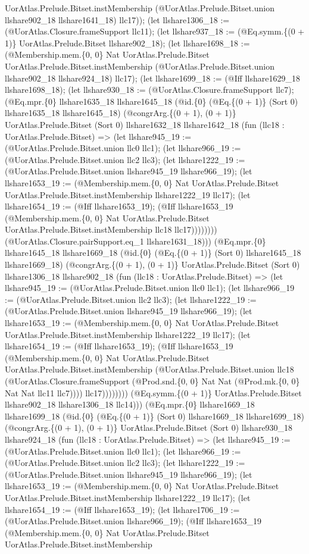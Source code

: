 \documentclass[11pt]{article}
\begin{document}
UorAtlas.Prelude.Bitset.instMembership (@UorAtlas.Prelude.Bitset.union llshare902\_18 llshare1641\_18) llc17)); (let llshare1306\_18 := (@UorAtlas.Closure.frameSupport llc11); (let llshare937\_18 := (@Eq.symm.\{(0 + 1)\} UorAtlas.Prelude.Bitset llshare902\_18); (let llshare1698\_18 := (@Membership.mem.\{0, 0\} Nat UorAtlas.Prelude.Bitset UorAtlas.Prelude.Bitset.instMembership (@UorAtlas.Prelude.Bitset.union llshare902\_18 llshare924\_18) llc17); (let llshare1699\_18 := (@Iff llshare1629\_18 llshare1698\_18); (let llshare930\_18 := (@UorAtlas.Closure.frameSupport llc7); (@Eq.mpr.\{0\} llshare1635\_18 llshare1645\_18 (@id.\{0\} (@Eq.\{(0 + 1)\} (Sort 0) llshare1635\_18 llshare1645\_18) (@congrArg.\{(0 + 1), (0 + 1)\} UorAtlas.Prelude.Bitset (Sort 0) llshare1632\_18 llshare1642\_18 (fun (llc18 : UorAtlas.Prelude.Bitset) => (let llshare945\_19 := (@UorAtlas.Prelude.Bitset.union llc0 llc1); (let llshare966\_19 := (@UorAtlas.Prelude.Bitset.union llc2 llc3); (let llshare1222\_19 := (@UorAtlas.Prelude.Bitset.union llshare945\_19 llshare966\_19); (let llshare1653\_19 := (@Membership.mem.\{0, 0\} Nat UorAtlas.Prelude.Bitset UorAtlas.Prelude.Bitset.instMembership llshare1222\_19 llc17); (let llshare1654\_19 := (@Iff llshare1653\_19); (@Iff llshare1653\_19 (@Membership.mem.\{0, 0\} Nat UorAtlas.Prelude.Bitset UorAtlas.Prelude.Bitset.instMembership llc18 llc17)))))))) (@UorAtlas.Closure.pairSupport.eq\_1 llshare1631\_18))) (@Eq.mpr.\{0\} llshare1645\_18 llshare1669\_18 (@id.\{0\} (@Eq.\{(0 + 1)\} (Sort 0) llshare1645\_18 llshare1669\_18) (@congrArg.\{(0 + 1), (0 + 1)\} UorAtlas.Prelude.Bitset (Sort 0) llshare1306\_18 llshare902\_18 (fun (llc18 : UorAtlas.Prelude.Bitset) => (let llshare945\_19 := (@UorAtlas.Prelude.Bitset.union llc0 llc1); (let llshare966\_19 := (@UorAtlas.Prelude.Bitset.union llc2 llc3); (let llshare1222\_19 := (@UorAtlas.Prelude.Bitset.union llshare945\_19 llshare966\_19); (let llshare1653\_19 := (@Membership.mem.\{0, 0\} Nat UorAtlas.Prelude.Bitset UorAtlas.Prelude.Bitset.instMembership llshare1222\_19 llc17); (let llshare1654\_19 := (@Iff llshare1653\_19); (@Iff llshare1653\_19 (@Membership.mem.\{0, 0\} Nat UorAtlas.Prelude.Bitset UorAtlas.Prelude.Bitset.instMembership (@UorAtlas.Prelude.Bitset.union llc18 (@UorAtlas.Closure.frameSupport (@Prod.snd.\{0, 0\} Nat Nat (@Prod.mk.\{0, 0\} Nat Nat llc11 llc7)))) llc17)))))))) (@Eq.symm.\{(0 + 1)\} UorAtlas.Prelude.Bitset llshare902\_18 llshare1306\_18 llc14))) (@Eq.mpr.\{0\} llshare1669\_18 llshare1699\_18 (@id.\{0\} (@Eq.\{(0 + 1)\} (Sort 0) llshare1669\_18 llshare1699\_18) (@congrArg.\{(0 + 1), (0 + 1)\} UorAtlas.Prelude.Bitset (Sort 0) llshare930\_18 llshare924\_18 (fun (llc18 : UorAtlas.Prelude.Bitset) => (let llshare945\_19 := (@UorAtlas.Prelude.Bitset.union llc0 llc1); (let llshare966\_19 := (@UorAtlas.Prelude.Bitset.union llc2 llc3); (let llshare1222\_19 := (@UorAtlas.Prelude.Bitset.union llshare945\_19 llshare966\_19); (let llshare1653\_19 := (@Membership.mem.\{0, 0\} Nat UorAtlas.Prelude.Bitset UorAtlas.Prelude.Bitset.instMembership llshare1222\_19 llc17); (let llshare1654\_19 := (@Iff llshare1653\_19); (let llshare1706\_19 := (@UorAtlas.Prelude.Bitset.union llshare966\_19); (@Iff llshare1653\_19 (@Membership.mem.\{0, 0\} Nat UorAtlas.Prelude.Bitset UorAtlas.Prelude.Bitset.instMembership 
\end{document}
